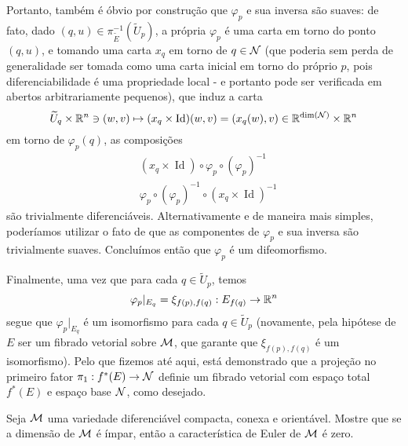 \begin{dem}
\begin{oobs}
Portanto, também é óbvio por construção que $\varphi_p$ e sua inversa são suaves: de fato, dado $(q, u) \in  \pi_{\widetilde{E}}^{-1}(\widetilde{U}_p )$, a própria $\varphi_p$ é uma carta em torno do ponto $(q, u)$, e tomando uma carta $x_q$ em torno de $q \in \mathcal{N}$ (que poderia sem perda de generalidade ser tomada como uma carta inicial em torno do próprio $p$, pois diferenciabilidade é uma propriedade local - e portanto pode ser verificada em abertos arbitrariamente pequenos), que induz a carta \[ \widetilde{U}_{q} \times \mathbb{R}^n \ni (w, v) \mapsto (x_q \times \operatorname{Id})(w, v)  = (x_q(w), v) \in \mathbb{R}^{\dim(\mathcal{N})} \times \mathbb{R}^n\]
em torno de $\varphi_p(q)$, as composições 
\[ \begin{aligned}
&(x_q \times \operatorname{Id}) \circ \varphi_p \circ (\varphi_p)^{-1} \\
&\varphi_p \circ (\varphi_p)^{-1} \circ (x_q \times \operatorname{Id})^{-1}
\end{aligned}
\]
são trivialmente diferenciáveis. Alternativamente e de maneira mais simples, poderíamos utilizar o fato de que as componentes de $\varphi_p$ e sua inversa são trivialmente suaves. Concluímos então que $\varphi_p$ é um difeomorfismo. \par 
Finalmente, uma vez que para cada $q \in \widetilde{U}_p$, temos
\[
\varphi_p\vert_{E_q} = \xi_{f(p), f(q)} : E_{f(q)} \to \mathbb{R}^n
\]
segue que $\varphi_p\vert_{E_q}$ é um isomorfismo para cada $q \in \widetilde{U}_p$ (novamente, pela hipótese de $E$ ser um fibrado vetorial sobre $\mathcal{M}$, que garante que $\xi_{f(p), f(q)}$ é um isomorfismo). Pelo que fizemos até aqui, está demonstrado que a projeção no primeiro fator $\pi_1: f^{*}(E) \to \mathcal{N}$ definie um fibrado vetorial com espaço total $f^{*}(E)$ e espaço base $\mathcal{N}$, como desejado.
\end{oobs}
\end{dem}

\begin{Mybox}
Seja $\mathcal{M}$ uma variedade diferenciável compacta, conexa e orientável. Mostre que se a dimensão de $\mathcal{M}$ é ímpar, então a característica de Euler de $\mathcal{M}$ é zero.
\vspace{-.4cm}
\end{Mybox}
\vspace{-.4cm}

